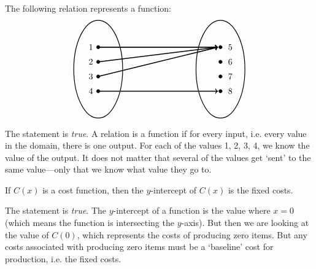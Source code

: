 \documentclass[11pt,letterpaper]{article}
\begin{document}
\thispagestyle{title}


\quizsol The following relation represents a function:
	\[
	\begin{tikzpicture}
	\draw[line width=0.03cm] (0,0) circle (1 and 2);
	\draw[line width=0.03cm] (5,0) circle (1 and 2);
	
	\draw[fill=black] (0,0.9) circle (0.07);
	\draw[fill=black] (0,0.3) circle (0.07);
	\draw[fill=black] (0,-0.3) circle (0.07);
	\draw[fill=black] (0,-0.9) circle (0.07);
	
	\draw[fill=black] (5,0.9) circle (0.07);
	\draw[fill=black] (5,0.3) circle (0.07);
	\draw[fill=black] (5,-0.3) circle (0.07);
	\draw[fill=black] (5,-0.9) circle (0.07);
	
	\draw[line width=0.04cm,->] (0,0.9) -- (4.9,0.9);
	\draw[line width=0.04cm,->] (0,0.3) -- (4.9,0.9);
	\draw[line width=0.04cm,->] (0,-0.3) -- (4.9,0.9);
	\draw[line width=0.04cm,->] (0,-0.9) -- (4.9,-0.9);
	
	\node at (-0.3,0.9) {$1$};
	\node at (-0.3,0.3) {$2$};
	\node at (-0.3,-0.3) {$3$};
	\node at (-0.3,-0.9) {$4$};
	
	\node at (5.4,0.9) {$5$};
	\node at (5.4,0.3) {$6$};
	\node at (5.4,-0.3) {$7$};
	\node at (5.4,-0.9) {$8$};
	\end{tikzpicture}
	\]

\sol The statement is \textit{true}. A relation is a function if for every input, i.e. every value in the domain, there is one output. For each of the values 1, 2, 3, 4, we know the value of the output. It does not matter that several of the values get `sent' to the same value---only that we know what value they go to. \pspace



\quizsol If $C(x)$ is a cost function, then the $y$-intercept of $C(x)$ is the fixed costs. \pspace

\sol The statement is \textit{true}. The $y$-intercept of a function is the value where $x= 0$ (which means the function is intersecting the $y$-axis). But then we are looking at the value of $C(0)$, which represents the costs of producing zero items. But any costs associated with producing zero items must be a `baseline' cost for production, i.e. the fixed costs. 
\end{document}
